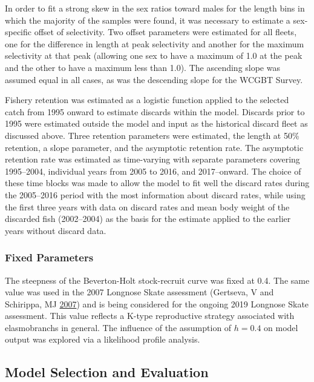 \documentclass[12pt,]{article}
\begin{document}
In order to fit a strong skew in the sex ratios toward males for the
length bins in which the majority of the samples were found, it was
necessary to estimate a sex-specific offset of selectivity. Two offset
parameters were estimated for all fleets, one for the difference in
length at peak selectivity and another for the maximum selectivity at
that peak (allowing one sex to have a maximum of 1.0 at the peak and the
other to have a maximum less than 1.0). The ascending slope was assumed
equal in all cases, as was the descending slope for the WCGBT Survey.

Fishery retention was estimated as a logistic function applied to the
selected catch from 1995 onward to estimate discards within the model.
Discards prior to 1995 were estimated outside the model and input as the
historical discard fleet as discussed above. Three retention parameters
were estimated, the length at 50\% retention, a slope parameter, and the
asymptotic retention rate. The asymptotic retention rate was estimated
as time-varying with separate parameters covering 1995--2004, individual
years from 2005 to 2016, and 2017--onward. The choice of these time
blocks was made to allow the model to fit well the discard rates during
the 2005--2016 period with the most information about discard rates,
while using the first three years with data on discard rates and mean
body weight of the discarded fish (2002--2004) as the basis for the
estimate applied to the earlier years without discard data.

\hypertarget{fixed-parameters}{%
\subsubsection{Fixed Parameters}\label{fixed-parameters}}

The steepness of the Beverton-Holt stock-recruit curve was fixed at 0.4.
The same value was used in the 2007 Longnose Skate assessment (Gertseva,
V and Schirippa, MJ \protect\hyperlink{ref-Gertseva2007}{2007}) and is
being considered for the ongoing 2019 Longnose Skate assessment. This
value reflects a K-type reproductive strategy associated with
elasmobranchs in general. The influence of the assumption of \(h=0.4\)
on model output was explored via a likelihood profile analysis.

\hypertarget{model-selection-and-evaluation}{%
\subsection{Model Selection and
Evaluation}\label{model-selection-and-evaluation}}
\end{document}
